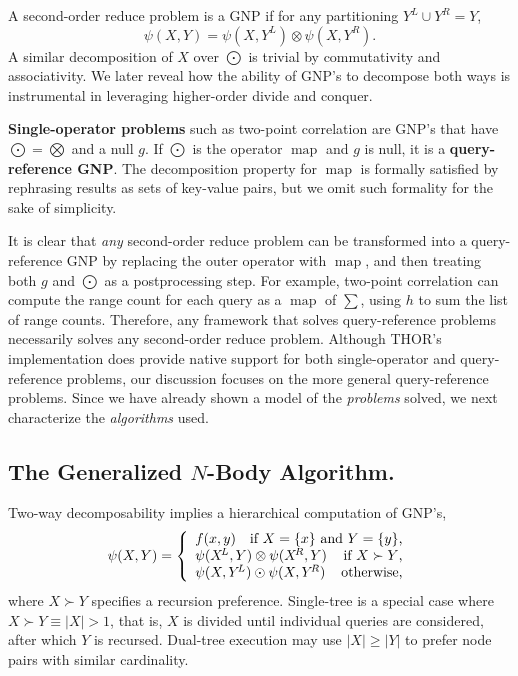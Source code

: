 \documentclass[twoside,leqno,twocolumn]{article}
\newcommand{\union}{\cup}
\newcommand{\prefsplit}[2]{#1 \succ #2}
\DeclareMathOperator*{\map}{map}
\newcommand{\gnp}{\psi}
\newcommand{\mysub}[1]{\subsection{#1.}}
\newcommand{\defterm}[1]{{\bf #1}}
\newcommand{\kdleft}[1]{#1^{\!L}}
\newcommand{\kdright}[1]{#1^{\!R}}
\begin{document}
A second-order reduce problem is a GNP if for any partitioning $\kdleft{Y} \union \kdright{Y} = Y$,
\[\gnp(X,Y) = \gnp(X,\kdleft{Y}) \otimes \gnp(X,\kdright{Y}).\]
\noindent A similar decomposition of $X$ over $\bigodot$ is trivial by commutativity and associativity.
We later reveal how the ability of GNP's to decompose both ways is instrumental in leveraging higher-order divide and conquer.

\defterm{Single-operator problems} such as two-point correlation are GNP's that have $\bigodot = \bigotimes$ and a null $g$.
If $\bigodot$ is the operator $\map$ and $g$ is null, it is a \defterm{query-reference GNP}.
The decomposition property for $\map$ is formally satisfied by rephrasing results as sets of key-value pairs, but we omit such formality for the sake of simplicity.

It is clear that {\em any} second-order reduce problem can be transformed into a query-reference GNP by replacing the outer operator with $\map$, and then treating both $g$ and $\bigodot$ as a postprocessing step.
For example, two-point correlation can compute the range count for each query as a $\map$ of $\sum$, using $h$ to sum the list of range counts.
Therefore, any framework that solves query-reference problems necessarily solves any second-order reduce problem.
Although THOR's implementation does provide native support for both single-operator and query-reference problems, our discussion focuses on the more general query-reference problems.
Since we have already shown a model of the {\it problems} solved, we next characterize the {\it algorithms} used.

\mysub{The Generalized $N$-Body Algorithm}
Two-way decomposability implies a hierarchical computation of GNP's,
\[
\gnp(X,Y) = \left\{ \begin{array}{lrr}
    f(x,y) & \multicolumn{2}{r}{\text{if }X = \{x\}\text{ and }Y = \{y\}\text{,}}
    \\
    \multicolumn{2}{l}{\gnp(\kdleft{X},Y) \otimes \gnp(\kdright{X}, Y)} & \text{if }\prefsplit{X}{Y}\text{,}
    \\
    \multicolumn{2}{l}{\gnp(X,\kdleft{Y}) \odot \gnp(X,\kdright{Y})} & \text{otherwise,}
  \end{array}
\right.
\]
\noindent
where $\prefsplit{X}{Y}$ specifies a recursion preference.
Single-tree is a special case where $\prefsplit{X}{Y} \equiv |X| > 1$, that is, $X$ is divided until individual queries are considered, after which $Y$ is recursed.
Dual-tree execution may use $|X| \geq |Y|$ to prefer node pairs with similar cardinality.
\end{document}
